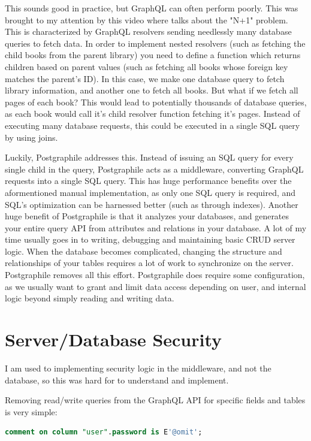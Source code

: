 \documentclass{l4proj}
\begin{document}
This sounds good in practice, but GraphQL can often perform poorly. This was brought to my attention by this video where \citet{Awad} talks about the "N+1" problem. This is characterized by GraphQL resolvers sending needlessly many database queries to fetch data. In order to implement nested resolvers (such as fetching the child books from the parent library) you need to define a function which returns children based on parent values (such as fetching all books whose foreign key matches the parent's ID). In this case, we make one database query to fetch library information, and another one to fetch all books. But what if we fetch all pages of each book? This would lead to potentially thousands of database queries, as each book would call it's child resolver function fetching it's pages. Instead of executing many database requests, this could be executed in a single SQL query by using joins.

Luckily, Postgraphile addresses this. Instead of issuing an SQL query for every single child in the query, Postgraphile acts as a middleware, converting GraphQL requests into a single SQL query. This has huge performance benefits over the aformentioned manual implementation, as only one SQL query is required, and SQL's optimization can be harnessed better (such as through indexes). Another huge benefit of Postgraphile is that it analyzes your databases, and generates your entire query API from attributes and relations in your database. A lot of my time usually goes in to writing, debugging and maintaining basic CRUD server logic. When the database becomes complicated, changing the structure and relationships of your tables requires a lot of work to synchronize on the server. Postgraphile removes all this effort. Postgraphile does require some configuration, as we usually want to grant and limit data access depending on user, and internal logic beyond simply reading and writing data. 


\section{Server/Database Security}
I am used to implementing security logic in the middleware, and not the database, so this was hard for to understand and implement. 

Removing read/write queries from the GraphQL API for specific fields and tables is very simple:

\begin{lstlisting}[language=SQL, caption={This comment tells Postgraphile to omit password fields} ]
comment on column "user".password is E'@omit';
\end{lstlisting}
\end{document}
